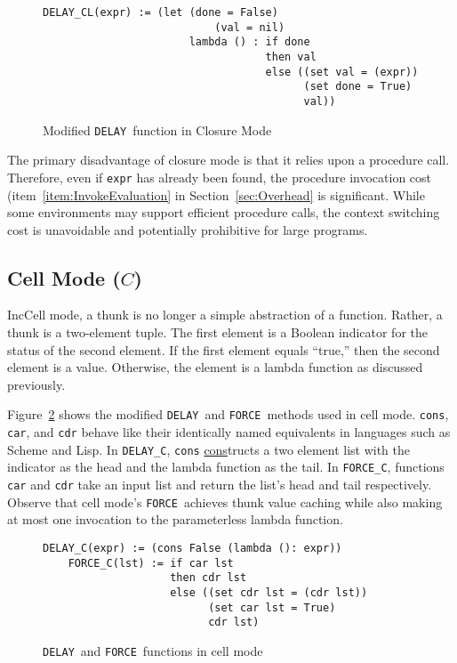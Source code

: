 \documentclass[11pt]{article}
\newcommand{\Delay}{\texttt{DELAY}}
\newcommand{\Force}{\texttt{FORCE}}
\begin{document}
\begin{figure}[ht]
  \begin{lstlisting}[]
    DELAY_CL(expr) := (let (done = False)
                           (val = nil)
                       lambda () : if done
                                   then val
                                   else ((set val = (expr))
                                         (set done = True)
                                         val))
  \end{lstlisting}
  \caption{Modified \Delay\ function in Closure Mode}
  \label{fig:impl:ClosureDelay}
\end{figure}

The primary disadvantage of closure mode is that it relies upon a procedure call.  Therefore, even if \texttt{expr} has already been found, the procedure invocation cost (item~\ref{item:InvokeEvaluation} in Section~\ref{sec:Overhead} is significant.  While some environments may support efficient procedure calls, the context switching cost is unavoidable and potentially prohibitive for large programs.

\subsection{Cell Mode ($C$)}\label{sec:CellMode}

IncCell mode, a thunk is no longer a simple abstraction of a function.  Rather, a thunk is a two-element tuple.  The first element is a Boolean indicator for the status of the second element.  If the first element equals ``true,'' then the second element is a value.  Otherwise, the element is a lambda function as discussed previously.

Figure~\ref{fig:impl:CellForceDelay} shows the modified \Delay\ and \Force\ methods used in cell mode.  \texttt{cons}, \texttt{car}, and \texttt{cdr} behave like their identically named equivalents in languages such as Scheme and Lisp.  In \Delay\texttt{\_C}, \texttt{cons} \underline{cons}tructs a two element list with the indicator as the head and the lambda function as the tail.  In \Force\texttt{\_C}, functions \texttt{car} and \texttt{cdr} take an input list and return the list's head and tail respectively.  Observe that cell mode's \Force\ achieves thunk value caching while also making at most one invocation to the parameterless lambda function.

\begin{figure}[ht]
  \begin{lstlisting}[]
    DELAY_C(expr) := (cons False (lambda (): expr))
    FORCE_C(lst) := if car lst
                    then cdr lst
                    else ((set cdr lst = (cdr lst))
                          (set car lst = True)
                          cdr lst)
  \end{lstlisting}
  \caption{\Delay\ and \Force\ functions in cell mode}
  \label{fig:impl:CellForceDelay}
\end{figure}
\end{document}
